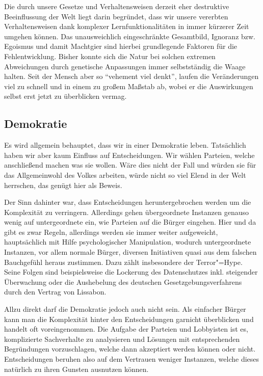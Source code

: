 Die durch unsere Gesetze und Verhaltensweisen derzeit eher destruktive Beeinflussung der Welt liegt darin begründet, dass wir unsere vererbten Verhaltensweisen dank komplexer Lernfunktionalitäten in immer kürzerer Zeit umgehen können. Das unausweichlich eingeschränkte Gesamtbild, Ignoranz bzw. Egoismus und damit Machtgier sind hierbei grundlegende Faktoren für die Fehlentwicklung. Bisher konnte sich die Natur bei solchen extremen Abweichungen durch genetische Anpassungen immer selbstständig die Waage halten. Seit der Mensch aber so "`vehement viel denkt"', laufen die Veränderungen viel zu schnell und in einem zu großem Maßstab ab, wobei er die Auswirkungen selbst erst jetzt zu überblicken vermag.

\subsection{Demokratie}\label{sec:situation/democracy}

Es wird allgemein behauptet, dass wir in einer Demokratie leben. Tatsächlich haben wir aber kaum Einfluss auf Entscheidungen. Wir wählen Parteien, welche anschließend machen was sie wollen. Wäre dies nicht der Fall und würden sie für das Allgemeinwohl des Volkes arbeiten, würde nicht so viel Elend in der Welt herrschen, das genügt hier als Beweis.

Der Sinn dahinter war, dass Entscheidungen heruntergebrochen werden um die Komplexität zu verringern. Allerdings gehen übergeordnete Instanzen genauso wenig auf untergeordnete ein, wie Parteien auf die Bürger eingehen. Hier und da gibt es zwar Regeln, allerdings werden sie immer weiter aufgeweicht, hauptsächlich mit Hilfe psychologischer Manipulation, wodurch untergeordnete Instanzen, vor allem normale Bürger, diversen Initiativen quasi aus dem falschen Bauchgefühl heraus zustimmen. Dazu zählt insbesondere der Terror"=Hype. Seine Folgen sind beispielsweise die Lockerung des Datenschutzes inkl. steigender Überwachung oder die Aushebelung des deutschen Gesetzgebungsverfahrens durch den Vertrag von Lissabon.

Allzu direkt darf die Demokratie jedoch auch nicht sein. Als einfacher Bürger kann man die Komplexität hinter den Entscheidungen garnicht überblicken und handelt oft voreingenommen. Die Aufgabe der Parteien und Lobbyisten ist es, komplizierte Sachverhalte zu analysieren und Lösungen mit entsprechenden Begründungen vorzuschlagen, welche dann akzeptiert werden können oder nicht. Entscheidungen beruhen also auf dem Vertrauen weniger Instanzen, welche dieses natürlich zu ihren Gunsten ausnutzen können.

